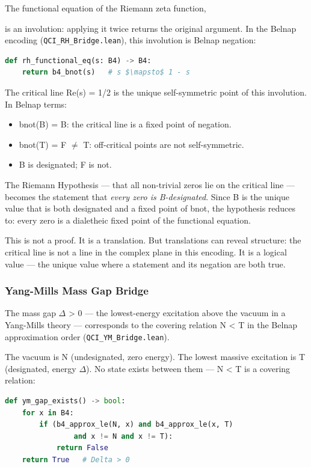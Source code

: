 \documentclass[12pt,a4paper]{article}
\begin{document}
The functional equation of the Riemann zeta function,

is an involution: applying it twice returns the original argument. In the Belnap encoding (\texttt{QCI\_RH\_Bridge.lean}), this involution is Belnap negation:

\begin{lstlisting}[language=Python]
def rh_functional_eq(s: B4) -> B4:
    return b4_bnot(s)   # s $\mapsto$ 1 - s
\end{lstlisting}

The critical line Re(s) = 1/2 is the unique self-symmetric point of this involution. In Belnap terms:

\begin{itemize}
    \item bnot(B) = B: the critical line is a fixed point of negation.
    \item bnot(T) = F $\neq$ T: off-critical points are not self-symmetric.
    \item B is designated; F is not.
\end{itemize}

The Riemann Hypothesis --- that all non-trivial zeros lie on the critical line --- becomes the statement that \emph{every zero is B-designated}. Since B is the unique value that is both designated and a fixed point of bnot, the hypothesis reduces to: every zero is a dialetheic fixed point of the functional equation.

This is not a proof. It is a translation. But translations can reveal structure: the critical line is not a line in the complex plane in this encoding. It is a logical value --- the unique value where a statement and its negation are both true.

\subsubsection{Yang-Mills Mass Gap Bridge}

The mass gap $\Delta$ \textgreater{} 0 --- the lowest-energy excitation above the vacuum in a Yang-Mills theory --- corresponds to the covering relation N \textless{} T in the Belnap approximation order (\texttt{QCI\_YM\_Bridge.lean}).

The vacuum is N (undesignated, zero energy). The lowest massive excitation is T (designated, energy $\Delta$). No state exists between them --- N \textless{} T is a covering relation:

\begin{lstlisting}[language=Python]
def ym_gap_exists() -> bool:
    for x in B4:
        if (b4_approx_le(N, x) and b4_approx_le(x, T)
                and x != N and x != T):
            return False
    return True   # Delta > 0
\end{lstlisting}
\end{document}
